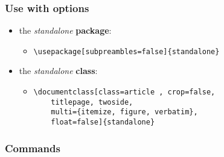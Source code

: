 \subsubsection[Use with Options]{\Large Use with options}
\begin{itemize}


\item the \emph{standalone} \textbf{package}:
\begin{itemize}
\item \begin{verbatim}\usepackage[subpreambles=false]{standalone}
\end{verbatim}
\end{itemize}

\item the \emph{standalone} \textbf{class}:
\begin{itemize}
\item \begin{verbatim}
\documentclass[class=article , crop=false,
    titlepage, twoside,
    multi={itemize, figure, verbatim},
    float=false]{standalone}
\end{verbatim}

\end{itemize}

\end{itemize}

\subsubsection[Commands]{\Large Commands}



